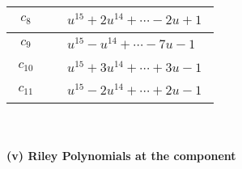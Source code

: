 \documentclass[1p]{elsarticle_modified}
\theoremstyle{definition}
\begin{document}
\begin{tabular}{m{50pt}|m{274pt}}
\hline $$\begin{aligned}c_{8}\end{aligned}$$&$\begin{aligned}
&u^{15}+2 u^{14}+\cdots-2 u+1
\end{aligned}$\\
\hline $$\begin{aligned}c_{9}\end{aligned}$$&$\begin{aligned}
&u^{15}- u^{14}+\cdots-7 u-1
\end{aligned}$\\
\hline $$\begin{aligned}c_{10}\end{aligned}$$&$\begin{aligned}
&u^{15}+3 u^{14}+\cdots+3 u-1
\end{aligned}$\\
\hline $$\begin{aligned}c_{11}\end{aligned}$$&$\begin{aligned}
&u^{15}-2 u^{14}+\cdots+2 u-1
\end{aligned}$\\
\hline
\end{tabular}\\~\\
\newpage\renewcommand{\arraystretch}{1}
\flushleft \textbf{(v) Riley Polynomials at the component}\newline \\
\end{document}
